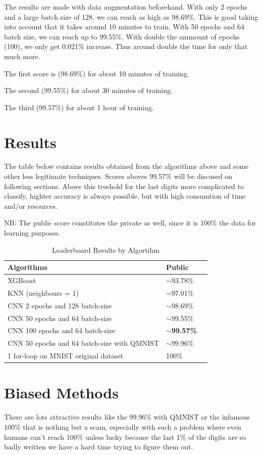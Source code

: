 \documentclass{article}
\begin{document}
The results are made with data augmentation beforehand. With only 2 epochs and a
large batch size of 128, we can reach as high as 98.69\%. This is good taking
into account that it takes around 10 minutes to train. With 50 epochs and 64
batch size, we can reach up to 99.55\%. With double the ammount of epochs (100),
we only get 0.021\% increase. Thus around double the time for only that much
more.

The first score is (98.69\%) for about 10 minutes of training.

The second (99.55\%) for about 30 minutes of training.

The third (99.57\%) for about 1 hour of training.


\section{Results}
The table below contains results obtained from the algorithms above and some
other less legitimate techniques. Scores aboves 99.57\% will be discused on 
following sections. Above this treshold for the last digits more complicated to
classify, highter accuracy is always possible, but with high consumtion of time
and/or resources.

NB: The public score constitutes the private as well, since it is 100\% the data
for learning purposes.

\begin{table}[!htbp]
  \caption{Leaderboard Results by Algortihm}
  \label{results-table}
  \centering
  \begin{tabular}{lll}
    \toprule
    Algorithms     & Public   \\
    \midrule
    XGBoost & $\sim$93.78\% \\
    KNN (neighbours = 1) & $\sim$97.01\% \\
    CNN 2 epochs and 128 batch-size & $\sim$98.69\% \\
    CNN 50 epochs and 64 batch-size & $\sim$99.55\% \\
    CNN 100 epochs and 64 batch-size & \textbf{$\sim$99.57\%} \\
    CNN 50 epochs and 64 batch-size with QMNIST & $\sim$99.96\% \\
    1 for-loop on MNIST original dataset & 100\% \\
    \bottomrule
  \end{tabular}
\end{table}


\section{Biased Methods}
There are lots attractive results like the 99.96\% with QMNIST or the infamous 
100\% that is nothing but a scam, especially with such a problem where even
humans can't reach 100\% unless lucky because the last 1\% of the digits are so
badly written we have a hard time trying to figure them out.
\end{document}
